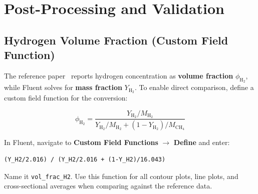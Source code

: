 \documentclass[12pt,a4paper]{report}
\begin{document}
\medskip
\noindent{}


\chapter{Post-Processing and Validation}
\label{ch:post}

\section{Hydrogen Volume Fraction (Custom Field Function)}

The reference paper~\cite{Eames2022} reports hydrogen concentration as
\textbf{volume fraction} $\phi_{\mathrm{H_2}}$, while Fluent solves for
\textbf{mass fraction} $Y_{\mathrm{H_2}}$.  To enable direct comparison,
define a custom field function for the conversion:

\begin{equation}
  \phi_{\mathrm{H_2}}
  = \frac{Y_{\mathrm{H_2}} / M_{\mathrm{H_2}}}
         {Y_{\mathrm{H_2}} / M_{\mathrm{H_2}}
          + (1 - Y_{\mathrm{H_2}}) / M_{\mathrm{CH_4}}}
  \label{eq:volfrac}
\end{equation}

\noindent In Fluent, navigate to \textbf{Custom Field Functions}
$\rightarrow$ \textbf{Define} and enter:

\begin{lstlisting}[language={},numbers=none]
(Y_H2/2.016) / (Y_H2/2.016 + (1-Y_H2)/16.043)
\end{lstlisting}

\noindent Name it \texttt{vol\_frac\_H2}.  Use this function for all
contour plots, line plots, and cross-sectional averages when comparing
against the reference data.
\end{document}

